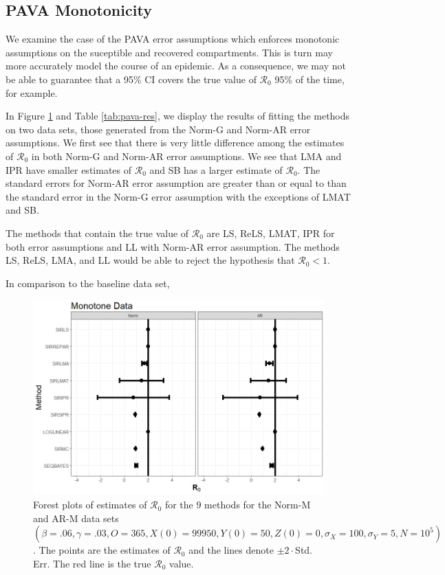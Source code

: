 \documentclass[12pt]{article}
\newcommand{\xxsir}{\ensuremath{9} } %
\newcommand{\rr}{\ensuremath{\mathcal{R}_0}}
\begin{document}
\subsection{PAVA Monotonicity}\label{sec:res-PAVA}
We examine the case of the PAVA error assumptions which enforces monotonic assumptions on the suceptible and recovered compartments.  This is turn may more accurately model the course of an epidemic.  As a consequence, we may not be able to guarantee that a 95\% CI covers the true value of $\rr$ 95\% of the time, for example.

In Figure \ref{fig:pava-res} and Table \ref{tab:pava-res}, we display the results of fitting the methods on two data sets, those generated from the Norm-G and Norm-AR error assumptions.  We first see that there is very little difference among the estimates of $\rr$ in both Norm-G and Norm-AR error assumptions.  We see that LMA and IPR have smaller estimates of $\rr$ and SB has a larger estimate of $\rr$.  The standard errors for Norm-AR error assumption are greater than or equal to than the standard error in the Norm-G error assumption with the exceptions of LMAT and SB.

The methods that contain the true value of $\rr$ are LS, ReLS, LMAT, IPR for both error assumptions and LL with Norm-AR error assumption.  The methods LS, ReLS, LMA, and LL would be able to reject the hypothesis that $\rr < 1$.

In comparison to the baseline data set, 

\begin{figure}[H]
	\centering
	\includegraphics[scale=0.5]{images/mono.jpeg}
	\caption{Forest plots of estimates of $\rr$ for the \xxsir methods for the Norm-M and AR-M data sets $(\beta=.06, \gamma=.03, O=365, X(0)=99950, Y(0)=50, Z(0)=0, \sigma_X=100, \sigma_Y=5, N=10^5)$.  The points are the estimates of $\rr$ and the lines denote $\pm 2\cdot $Std. Err.  The red line is the true $\rr$ value.}
	\label{fig:pava-res}
\end{figure}
\end{document}
